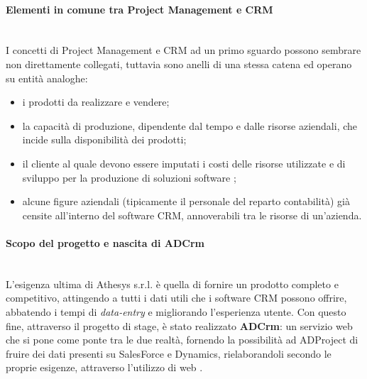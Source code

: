 \documentclass[12pt,a4paper,twoside,openany,english]{book}
\begin{document}
	\paragraph{Elementi in comune tra Project Management e CRM}~\\
		I concetti di Project Management e CRM ad un primo sguardo possono sembrare non direttamente collegati, tuttavia sono anelli di una stessa catena ed operano su entità analoghe:
		\begin{itemize}
			\itemsep-0.5em 
			\item i prodotti da realizzare e vendere;
			\item la capacità di produzione, dipendente dal tempo e dalle risorse aziendali, che incide sulla disponibilità dei prodotti;	
			\item il cliente al quale devono essere imputati i costi delle risorse utilizzate e di sviluppo per la produzione di soluzioni software ;
			\item alcune figure aziendali (tipicamente il personale del reparto contabilità) già censite all'interno del software CRM, annoverabili tra le risorse di un'azienda.
		\end{itemize}
	\par
	
	\paragraph{Scopo del progetto e nascita di ADCrm}~\\
		L'esigenza ultima di Athesys s.r.l. è quella di fornire un prodotto completo e competitivo, attingendo a tutti i dati utili che i software CRM possono offrire, abbatendo i tempi di \textit{data-entry} e migliorando l'esperienza utente. Con questo fine, attraverso il progetto di stage, è stato realizzato \textbf{ADCrm}: un servizio web che si pone come ponte tra le due realtà, fornendo la possibilità ad ADProject di fruire dei dati presenti su SalesForce e Dynamics, rielaborandoli secondo le proprie esigenze, attraverso l'utilizzo di web .
	\par

\tableofcontents
\listoffigures
\listoftables
\mainmatter
\end{document}
